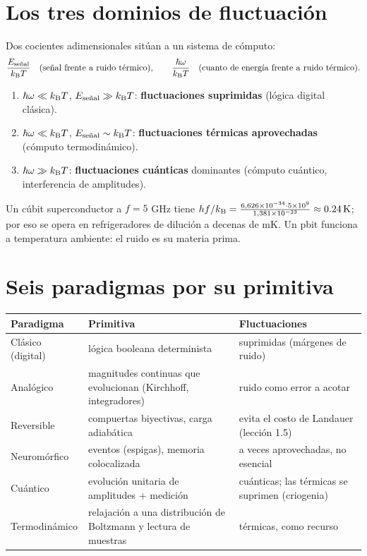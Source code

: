 \documentclass[11pt,a4paper]{article}
\begin{document}
\section{Los tres dominios de fluctuación}
Dos cocientes adimensionales sitúan a un sistema de cómputo:
\[
\frac{E_{\text{señal}}}{k_{\mathrm B} T}\quad\text{(señal frente a ruido térmico)},\qquad
\frac{\hbar\omega}{k_{\mathrm B} T}\quad\text{(cuanto de energía frente a ruido térmico)}.
\]
\begin{enumerate}[nosep]
\item $\hbar\omega\ll k_{\mathrm B} T$, $E_{\text{señal}}\gg k_{\mathrm B} T$: \textbf{fluctuaciones suprimidas} (lógica digital clásica).
\item $\hbar\omega\ll k_{\mathrm B} T$, $E_{\text{señal}}\sim k_{\mathrm B} T$: \textbf{fluctuaciones térmicas aprovechadas} (cómputo termodinámico).
\item $\hbar\omega\gg k_{\mathrm B} T$: \textbf{fluctuaciones cuánticas} dominantes (cómputo cuántico, interferencia de amplitudes).
\end{enumerate}
\begin{ejemplo}
Un cúbit superconductor a $f=5$ GHz tiene $hf/k_{\mathrm B}=\frac{6{,}626\times10^{-34}\cdot5\times10^9}{1{,}381\times10^{-23}}
\approx\SI{0.24}{K}$; por eso se opera en refrigeradores de dilución a decenas de mK. Un pbit funciona a
temperatura ambiente: el ruido es su materia prima.
\end{ejemplo}

\section{Seis paradigmas por su primitiva}
\begin{center}\small
\begin{tabularx}{\linewidth}{lXX}\toprule
Paradigma & Primitiva & Fluctuaciones\\\midrule
Clásico (digital) & lógica booleana determinista & suprimidas (márgenes de ruido)\\
Analógico & magnitudes continuas que evolucionan (Kirchhoff, integradores) & ruido como error a acotar\\
Reversible & compuertas biyectivas, carga adiabática & evita el costo de Landauer (lección 1.5)\\
Neuromórfico & eventos (espigas), memoria colocalizada & a veces aprovechadas, no esencial\\
Cuántico & evolución unitaria de amplitudes + medición & cuánticas; las térmicas se suprimen (criogenia)\\
Termodinámico & relajación a una distribución de Boltzmann y lectura de muestras & térmicas, como recurso\\\bottomrule
\end{tabularx}
\end{center}
\end{document}
